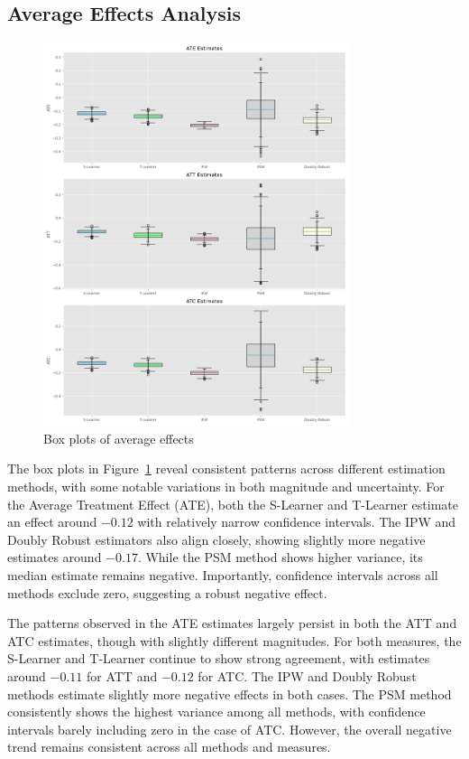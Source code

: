 \documentclass{article}
\begin{document}
\subsection{Average Effects Analysis}

\begin{figure}[h!]
    \centering
    \caption{Box plots of average effects}
    \label{fig:box_plots}
    \includegraphics[width = 0.8\textwidth]{plots/box_plots.png}
\end{figure}

The box plots in Figure~\ref{fig:box_plots} reveal consistent patterns across different estimation methods, with some notable variations in both magnitude and uncertainty. For the Average Treatment Effect (ATE), both the S-Learner and T-Learner estimate an effect around $-0.12$ with relatively narrow confidence intervals. The IPW and Doubly Robust estimators also align closely, showing slightly more negative estimates around $-0.17$. While the PSM method shows higher variance, its median estimate remains negative. Importantly, confidence intervals across all methods exclude zero, suggesting a robust negative effect.

The patterns observed in the ATE estimates largely persist in both the ATT and ATC estimates, though with slightly different magnitudes. For both measures, the S-Learner and T-Learner continue to show strong agreement, with estimates around $-0.11$ for ATT and $-0.12$ for ATC. The IPW and Doubly Robust methods estimate slightly more negative effects in both cases. The PSM method consistently shows the highest variance among all methods, with confidence intervals barely including zero in the case of ATC. However, the overall negative trend remains consistent across all methods and measures.
\end{document}
